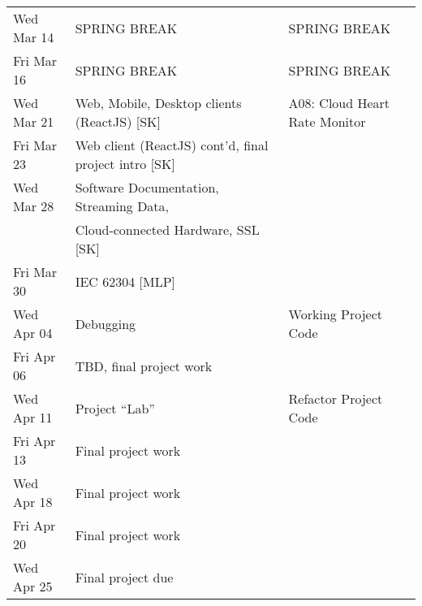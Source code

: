 \begin{longtable}[c]{|l|l|l|}
    \hline
    Wed Mar 14     &
        SPRING BREAK & SPRING BREAK \\
    Fri Mar 16    &
        SPRING BREAK & SPRING BREAK \\
    \hline
    Wed Mar 21    &
        Web, Mobile, Desktop clients (ReactJS) [SK] &
        A08: Cloud Heart Rate Monitor \\
    Fri Mar 23     &
        Web client (ReactJS) cont'd, final project intro [SK] & \\
    \hline
    Wed Mar 28    &
        Software Documentation, Streaming Data, & \\ & Cloud-connected Hardware, SSL [SK] & \\
    Fri Mar 30     &
        IEC 62304 [MLP] & \\
    \hline
    Wed Apr 04     &
        Debugging &
        Working Project Code \\
    Fri Apr 06    &
        TBD, final project work & \\
    \hline
    Wed Apr 11     &
        Project ``Lab'' &
        Refactor Project Code \\
    Fri Apr 13    &
        Final project work & \\
    \hline
    Wed Apr 18    &
        Final project work & \\
    Fri Apr 20    &
        Final project work & \\
    \hline
    Wed Apr 25    &
        Final project due & \\
    \hline


\end{longtable}
